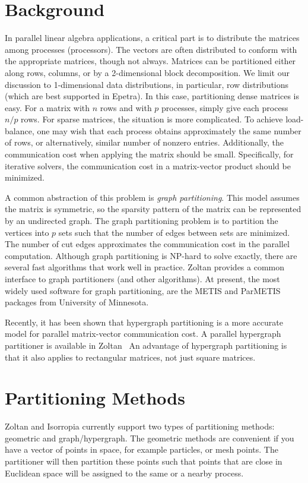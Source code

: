 \section{Background}
In parallel linear algebra applications, a critical part is to 
distribute the matrices among processes (processors). The vectors are 
often distributed to conform
with the appropriate matrices, though not always. Matrices can
be partitioned either along rows, columns, or by a 2-dimensional
block decomposition. We limit our discussion to 1-dimensional data
distributions, in particular, row distributions  (which are best supported 
in Epetra). In this case, partitioning dense matrices is easy.
For a matrix with $n$ rows and with $p$ processes, simply give
each process $n/p$  rows. For sparse matrices, the situation
is more complicated. To achieve load-balance, one may wish 
that each process obtains approximately the same number of rows,
or alternatively, similar number of nonzero entries. 
Additionally, the communication cost when applying the matrix
should be small. Specifically, for iterative solvers, the
communication cost in a matrix-vector product should be minimized.

A common abstraction of this problem is \emph{graph partitioning}.
This model assumes the matrix is symmetric, so the sparsity 
pattern of the matrix can be represented by an undirected graph.
The graph partitioning problem is to partition the
vertices into $p$ sets such that the number of edges between
sets are minimized. The number of cut edges approximates the
communication cost in the parallel computation. Although 
graph partitioning is NP-hard to solve exactly, there are
several fast algorithms that work well in practice. Zoltan
provides a common interface to graph partitioners (and other algorithms).
At present, the most widely used software for graph partitioning,
are the METIS and ParMETIS \cite{Metis,KarypisK99} packages from University 
of Minnesota.

Recently, it has been shown \cite{CatAyk99} that hypergraph partitioning 
is a more accurate model for parallel matrix-vector communication cost.
A parallel hypergraph partitioner is available in Zoltan~\cite{ZoltanParHyp06ipdps,ZoltanIPDPS07}
An advantage of hypergraph partitioning is that it
also applies to rectangular matrices, not just square matrices.

\section{Partitioning Methods}
\label{sec:methods}
Zoltan and Isorropia currently support two types of partitioning methods: geometric and graph/hypergraph. The geometric methods are convenient if you have a vector of points in space, for example particles, or mesh points. The partitioner will then partition these points such that points that are close in Euclidean space will be assigned to the same or a nearby process. 

